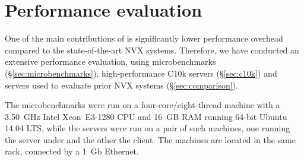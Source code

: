 \section{Performance evaluation}
\label{sec:evaluation}

One of the main contributions of \nx is significantly lower
performance overhead compared to the state-of-the-art NVX systems.
Therefore, we have conducted an extensive performance evaluation,
using microbenchmarks (\S\ref{sec:microbenchmarks}), high-performance
C10k servers (\S\ref{sec:c10k}) and servers used to evaluate prior NVX
systems (\S\ref{sec:comparison}).

The microbenchmarks were run on a four-core/eight-thread machine with
a 3.50~GHz Intel Xeon~E3-1280 CPU and 16~GB RAM running 64-bit Ubuntu
14.04 LTS, while the servers were run on a pair of such machines, one
running the server under \nx and the other the client.  The machines
are located in the same rack, connected by a 1~Gb Ethernet.




